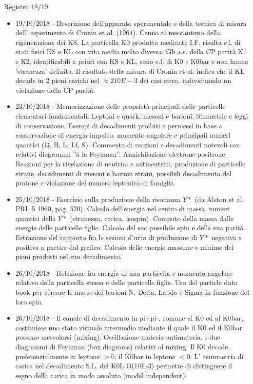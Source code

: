 \begin{frame}[allowframebreaks]{Registro 18/19}
\begin{itemize}
\item 19/10/2018 - Descrizione dell'apparato sperimentale e della tecnica di misura dell' esperimento di Cronin et al. (1964). Cenno al meccanismo della rigenerazione dei KS. La particella K0 prodotta mediante I.F. risulta c.l. di stati fisici KS e KL con vita media molto diversa. Gli a.s. della CP parità K1 e K2, identificabili a priori con KS e KL, sono c.l. di K0 e K0bar e non hanno 'stranezza' definita. Il risultato della misura di Cronin et al. indica che il KL decade in 2 pioni carichi nel $\approx2 10E-3$ dei casi circa, individuando un violazione della CP parit\'a.
\item 23/10/2018 - Memorizzazione delle proprietà principali delle particelle elementari fondamentali. Leptoni e quark, mesoni e barioni. Simmetrie e leggi di conservazione. Esempi di decadimenti proibiti e permessi in base a conservazione di energia-impulso, momento angolare e principali numeri quantici (Q, B, L, Lf, S). Commento di reazioni e decadimenti notevoli con relativi diagrammi ''\'a la Feynman''. Annichilazione elettrone-positrone. Reazioni per la rivelazione di neutrini e antineutrini, produzione di particelle strane, decadimenti di mesoni e barioni strani, possibili decadimento del protone e violazione del numero leptonico di famiglia.
\item 25/10/2018 - Esercizio sulla produzione della risonanza $Y*$ (da Alston et al. PRL 5 1960, pag. 520). Calcolo dell'energia nel centro di massa, numeri quantici della $Y*$ (stranezza, carica, isospin). Computo della massa dalle energie delle particelle figlie. Calcolo del suo possibile spin e della sua parit\'a. Estrazione del rapporto fra le sezioni d’urto di produzione di $Y*$ negativa e positiva a partire dal grafico. Calcolo delle energie massime e minime dei pioni prodotti nel suo decadimento.
\item 26/10/2018 - Relazione fra energia di una particella e momento angolare relativo della particella stessa e delle particelle figlie. Uso del particle data book per cercare le masse dei barioni N, Delta, Labda e Sigma in funzione del loro spin.
\item 26/10/2018 - Il canale di decadimento in pi+pi-, comune al K0 ed al K0bar, costituisce uno stato virtuale intermedio mediante il quale il K0 ed il K0bar possono mescolarsi (mixing). Oscillazione materia-antimateria. I due diagrammi di Feynman (box diagrams) relativi al mixing. Il K0 decade preferenzialmente in leptone $>0$, il K0bar in leptone $<0$. L' asimmetria di carica nel decadimento S.L. del K0L O(10E-3) permette di distinguere il segno della carica in modo assoluto (model independent).

\end{itemize}
\end{frame}
